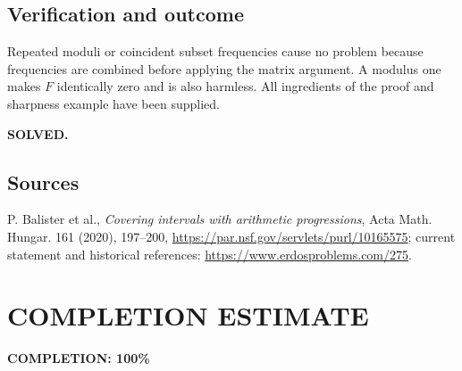 \subsection{Verification and outcome}
Repeated moduli or coincident subset frequencies cause no problem because frequencies are combined before applying the matrix argument. A modulus one makes $F$ identically zero and is also harmless. All ingredients of the proof and sharpness example have been supplied.

\textbf{SOLVED.}
\subsection{Sources}
P. Balister et al., \emph{Covering intervals with arithmetic progressions}, Acta Math. Hungar. 161 (2020), 197--200, \url{https://par.nsf.gov/servlets/purl/10165575}; current statement and historical references: \url{https://www.erdosproblems.com/275}.
\section{COMPLETION ESTIMATE}
\textbf{COMPLETION: 100\%}
